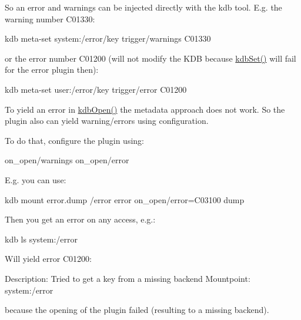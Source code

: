 So an error and warnings can be injected directly with the kdb tool. E.\+g. the warning number C01330\+:


\begin{DoxyCode}
kdb meta-set system:/error/key trigger/warnings C01330
\end{DoxyCode}


or the error number C01200 (will not modify the K\+DB because {\ttfamily \hyperlink{group__kdb_ga11436b058408f83d303ca5e996832bcf}{kdb\+Set()}} will fail for the error plugin then)\+:


\begin{DoxyCode}
kdb meta-set user:/error/key trigger/error C01200
\end{DoxyCode}


To yield an error in \hyperlink{group__kdb_ga6808defe5870f328dd17910aacbdc6ca}{kdb\+Open()} the metadata approach does not work. So the plugin also can yield warning/errors using configuration.

To do that, configure the plugin using\+:


\begin{DoxyCode}
on\_open/warnings
on\_open/error
\end{DoxyCode}


E.\+g. you can use\+:


\begin{DoxyCode}
kdb mount error.dump /error error on\_open/error=C03100 dump
\end{DoxyCode}


Then you get an error on any access, e.\+g.\+:


\begin{DoxyCode}
kdb ls system:/error
\end{DoxyCode}


Will yield error C01200\+:


\begin{DoxyCode}
Description: Tried to get a key from a missing backend
Mountpoint: system:/error
\end{DoxyCode}


because the opening of the plugin failed (resulting to a missing backend). 
